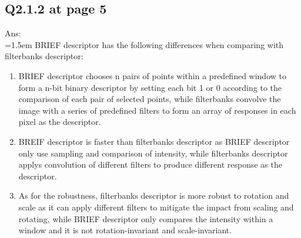 \documentclass{article}
\begin{document}
	\newpage
	\subsection*{Q2.1.2 at page 5}
	Ans:\\
	\hangindent=1.5em \hspace{1.5em} BRIEF descriptor has the following differences when comparing with filterbanks descriptor:
	\begin{enumerate}
		\item BRIEF descriptor chooses n pairs of points within a predefined window to form a n-bit binary descriptor by setting each bit 1 or 0 according to the comparison of each pair of selected points, while filterbanks convolve the image with a series of predefined filters to form an array of responses in each pixel as the descriptor.
		\item BREIF descriptor is faster than filterbanks descriptor as BRIEF descriptor only use sampling and comparison of intensity, while filterbanks descriptor applys convolution of different filters to produce different response as the descriptor. 
		\item As for the robustness, filterbanks descriptor is more robust to rotation and scale as it can apply different filters to mitigate the impact from scaling and rotating, while BRIEF descriptor only compares the intensity within a window and it is not rotation-invariant and scale-invariant. 
	\end{enumerate}
	
	\newpage
\end{document}
